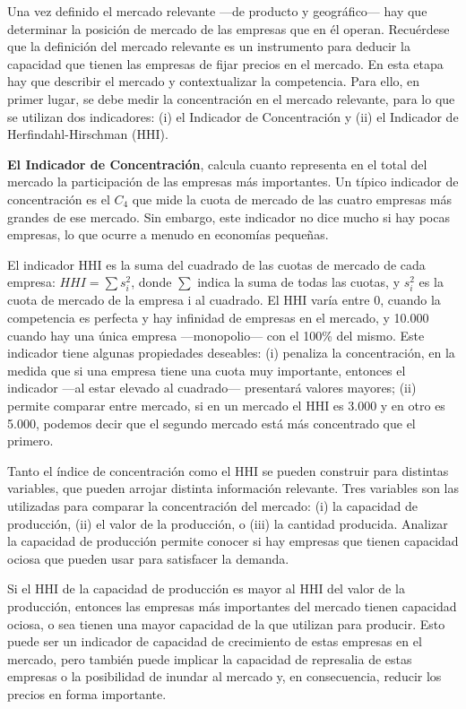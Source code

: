 \documentclass[
  12pt,
  spanish,
]{book}
\begin{document}
Una vez definido el mercado relevante ---de producto y geográfico--- hay
que determinar la posición de mercado de las empresas que en él operan.
Recuérdese que la definición del mercado relevante es un instrumento
para deducir la capacidad que tienen las empresas de fijar precios en el
mercado. En esta etapa hay que describir el mercado y contextualizar la
competencia. Para ello, en primer lugar, se debe medir la concentración
en el mercado relevante, para lo que se utilizan dos indicadores: (i) el
Indicador de Concentración y (ii) el Indicador de Herfindahl-Hirschman
(HHI).

\textbf{El Indicador de Concentración}, calcula cuanto representa en el
total del mercado la participación de las empresas más importantes. Un
típico indicador de concentración es el \(C_4\) que mide la cuota de
mercado de las cuatro empresas más grandes de ese mercado. Sin embargo,
este indicador no dice mucho si hay pocas empresas, lo que ocurre a
menudo en economías pequeñas.

El indicador HHI es la suma del cuadrado de las cuotas de mercado de
cada empresa: \(HHI = \sum s_i^2\), donde \(\sum\) indica la suma de
todas las cuotas, y \(s_i^2\) es la cuota de mercado de la empresa i al
cuadrado. El HHI varía entre 0, cuando la competencia es perfecta y hay
infinidad de empresas en el mercado, y 10.000 cuando hay una única
empresa ---monopolio--- con el 100\% del mismo. Este indicador tiene
algunas propiedades deseables: (i) penaliza la concentración, en la
medida que si una empresa tiene una cuota muy importante, entonces el
indicador ---al estar elevado al cuadrado--- presentará valores mayores;
(ii) permite comparar entre mercado, si en un mercado el HHI es 3.000 y
en otro es 5.000, podemos decir que el segundo mercado está más
concentrado que el primero.

Tanto el índice de concentración como el HHI se pueden construir para
distintas variables, que pueden arrojar distinta información relevante.
Tres variables son las utilizadas para comparar la concentración del
mercado: (i) la capacidad de producción, (ii) el valor de la producción,
o (iii) la cantidad producida. Analizar la capacidad de producción
permite conocer si hay empresas que tienen capacidad ociosa que pueden
usar para satisfacer la demanda.

Si el HHI de la capacidad de producción es mayor al HHI del valor de la
producción, entonces las empresas más importantes del mercado tienen
capacidad ociosa, o sea tienen una mayor capacidad de la que utilizan
para producir. Esto puede ser un indicador de capacidad de crecimiento
de estas empresas en el mercado, pero también puede implicar la
capacidad de represalia de estas empresas o la posibilidad de inundar al
mercado y, en consecuencia, reducir los precios en forma importante.
\end{document}
